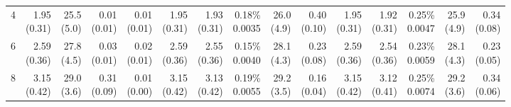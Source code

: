 \documentclass[11pt]{article}
\theoremstyle{plain}
\theoremstyle{definition}
\begin{document}
\begin{landscape}
\begin{table}
{\begin{tabular}{r|rrrr|rrrrr|rrrrr}
 				4 & \makecell{1.95\\ (0.31)} & \makecell{25.5\\ (5.0)} & \makecell{0.01\\ (0.01)} & \makecell{0.01\\ (0.01)} & \makecell{1.95\\ (0.31)} & \makecell{1.93\\ (0.31)} & \makecell{0.18\% \\ 0.0035} & \makecell{26.0\\ (4.9)} & \makecell{0.40\\ (0.10)} & \makecell{1.95\\ (0.31)} & \makecell{1.92\\ (0.31)} & \makecell{0.25\% \\ 0.0047} & \makecell{25.9\\ (4.9)} & \makecell{0.34\\ (0.08)} \\
 				6 & \makecell{2.59\\ (0.36)} & \makecell{27.8\\ (4.5)} & \makecell{0.03\\ (0.01)} & \makecell{0.02\\ (0.01)} & \makecell{2.59\\ (0.36)} & \makecell{2.55\\ (0.36)} & \makecell{0.15\% \\ 0.0040} & \makecell{28.1\\ (4.3)} & \makecell{0.23\\ (0.08)} & \makecell{2.59\\ (0.36)} & \makecell{2.54\\ (0.36)} & \makecell{0.23\% \\ 0.0059} & \makecell{28.1\\ (4.3)} & \makecell{0.23\\ (0.05)} \\
 				8 & \makecell{3.15\\ (0.42)} & \makecell{29.0\\ (3.6)} & \makecell{0.31\\ (0.09)} & \makecell{0.01\\ (0.00)} & \makecell{3.15\\ (0.42)} & \makecell{3.13\\ (0.42)} & \makecell{0.19\% \\ 0.0055} & \makecell{29.2\\ (3.5)} & \makecell{0.16\\ (0.04)} & \makecell{3.15\\ (0.42)} & \makecell{3.12\\ (0.41)} & \makecell{0.25\% \\ 0.0074} & \makecell{29.2\\ (3.6)} & \makecell{0.34\\ (0.06)} \\

\end{tabular}}
\end{table}
\end{landscape}
\end{document}
